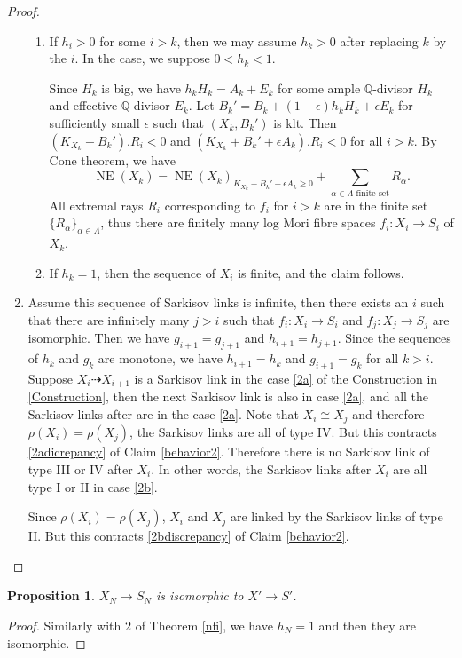 \documentclass[11pt]{amsart}
\newtheorem{prop}[defn]{Proposition}
\begin{document}
\begin{proof}
\begin{enumerate}
\begin{enumerate}
\item If $h_i>0$ for some $i>k$, then we may assume $h_k>0$ after replacing $k$ by the $i$. In the case, we suppose $0<h_k<1$. 

Since $H_{k}$ is big, we have $h_{k}H_{k}=A_{k}+E_{k}$ for some ample $\mathbb{Q}$-divisor $H_{k}$ and effective $\mathbb{Q}$-divisor  $E_{k}$. Let $B_{k}'=B_{k}+(1-\epsilon)h_{k}H_{k}+\epsilon E_{k}$ for sufficiently small $\epsilon$ such that $(X_{k},B_{k}')$ is klt. Then $(K_{X_{k}}+B_{k}').R_{i}<0$ and $(K_{X_{k}}+B_{k}'+\epsilon A_{k}).R_{i}<0$ for all $i>k$. By Cone theorem, we have 
  \[
    \overline{\operatorname{NE}}(X_{k})=\overline{\operatorname{NE}}(X_{k})_{K_{X_{k}}+B_{k}'+\epsilon A_{k}\geqslant 0} +\sum_{\alpha \in\Lambda\text{ finite set}}R_{\alpha}.
  \]
  All extremal rays $R_{i}$ corresponding to $f_{i}$ for $i>k$ are in the finite set $\{R_{\alpha}\}_{\alpha \in \Lambda} $, thus there are finitely many log Mori fibre spaces $f_{i}:X_{i}\to S_{i}$ of $X_{k}$. 

  \item If $h_k=1$, then the sequence of $X_i$ is finite, and the claim follows. 
\end{enumerate}
\item Assume this sequence of Sarkisov links is infinite, then there exists an  $i$ such that there are infinitely many $j>i$ such that $f_{i}:X_{i}\to S_{i}  $ and $f_{j}:X_{j}\to S_{j}$ are isomorphic. Then we have $g_{i+1}=g_{j+1}$ and $h_{i+1}=h_{j+1}$. Since the sequences of $h_{k}$ and $g_{k}$ are monotone, we have $h_{i+1}=h_{k}$ and  $g_{i+1}=g_{k}$ for all $k>i$. Suppose $X_{i}\dashrightarrow X_{i+1}$ is a Sarkisov link in the case \ref{2a} of the Construction in \ref{Construction}, then the next Sarkisov link is also in case \ref{2a}, and all the Sarkisov links after are in the case \ref{2a}. Note that $X_{i}\cong X_{j}$ and therefore $\rho(X_{i})=\rho(X_{j})$, the Sarkisov links are all of type IV. But this contracts  \ref{2adicrepancy} of Claim \ref{behavior2}. Therefore there is no Sarkisov link of type III or IV after $X_{i}$. In other words, the Sarkisov links after $X_{i}$ are all type I or II in case \ref{2b}.

  Since $\rho(X_{i})= \rho(X_{j})$, $X_{i}$  and $X_{j}$ are linked by  the Sarkisov links of type II. But this contracts  \ref{2bdiscrepancy} of  Claim \ref{behavior2}.
\end{enumerate}  
\end{proof}
\begin{prop}\label{nfi2}
$X_{N}\to S_{N}$ is isomorphic to $X'\to S'$. 
\end{prop}
\begin{proof}
  Similarly with $2$ of Theorem \ref{nfi}, we have $h_{N}=1$ and then they are isomorphic.
\end{proof}
\end{document}
